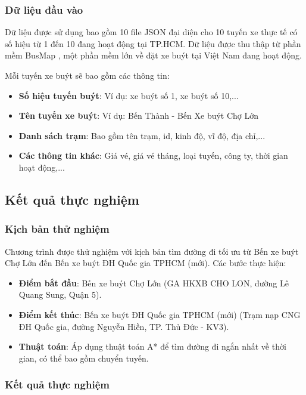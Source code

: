 \documentclass[a4paper,12pt]{article}
\begin{document}
\subsubsection{Dữ liệu đầu vào}

Dữ liệu được sử dụng bao gồm 10 file JSON đại diện cho 10 tuyến xe thực tế có số hiệu từ 1 đến 10 đang hoạt động tại TP.HCM. Dữ liệu được thu thập từ phần mềm BusMap \cite{busmap}, một phần mềm lớn về đặt xe buýt tại Việt Nam đang hoạt động.

Mỗi tuyến xe buýt sẽ bao gồm các thông tin:
\begin{itemize}
    \item \textbf{Số hiệu tuyến buýt}: Ví dụ: xe buýt số 1, xe buýt số 10,...
    \item \textbf{Tên tuyến xe buýt}: Ví dụ: Bến Thành - Bến Xe buýt Chợ Lớn
    \item \textbf{Danh sách trạm}: Bao gồm tên trạm, id, kinh độ, vĩ độ, địa chỉ,...
    \item \textbf{Các thông tin khác}: Giá vé, giá vé tháng, loại tuyến, công ty, thời gian hoạt động,...
\end{itemize}

\subsection{Kết quả thực nghiệm}
\subsubsection{Kịch bản thử nghiệm}

Chương trình được thử nghiệm với kịch bản tìm đường đi tối ưu từ Bến xe buýt Chợ Lớn đến Bến xe buýt ĐH Quốc gia TPHCM (mới). Các bước thực hiện:

\begin{itemize}
    \item \textbf{Điểm bắt đầu}: Bến xe buýt Chợ Lớn (GA HKXB CHO LON, đường Lê Quang Sung, Quận 5).
    \item \textbf{Điểm kết thúc}: Bến xe buýt ĐH Quốc gia TPHCM (mới) (Trạm nạp CNG ĐH Quốc gia, đường Nguyễn Hiền, TP. Thủ Đức - KV3).
    \item \textbf{Thuật toán}: Áp dụng thuật toán A* để tìm đường đi ngắn nhất về thời gian, có thể bao gồm chuyển tuyến.
\end{itemize}

\subsubsection{Kết quả thực nghiệm}
\end{document}
